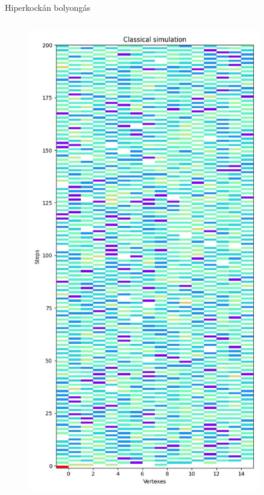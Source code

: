 \documentclass[aspectratio=169]{beamer}
\begin{document}
\begin{frame}{Hiperkockán bolyongás}

  \begin{columns}[onlytextwidth]
    \begin{column}{.23\textwidth}
      \begin{figure}
        \includegraphics[width=0.9\textwidth]{./tdk_figures/results/hypercube/classical.jpg}
      \end{figure}

\end{column}
\end{columns}
\end{frame}
\end{document}
